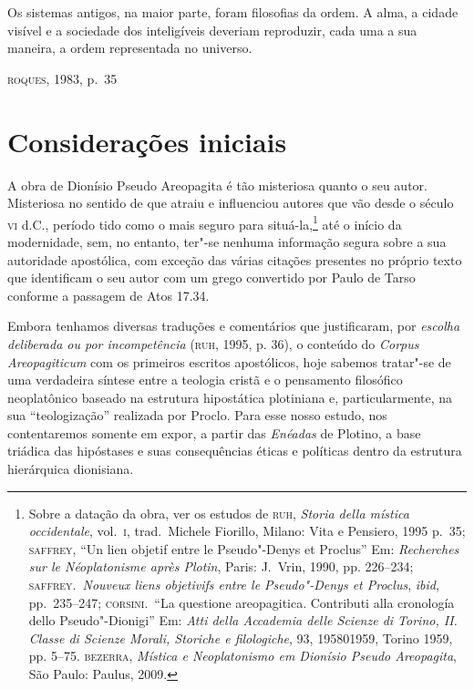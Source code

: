 

\epigraph{Os sistemas antigos, na maior parte, foram filosofias da ordem. A alma,
a cidade visível e a sociedade dos inteligíveis deveriam reproduzir,
cada uma a sua maneira, a ordem representada no universo.}{\textsc{roques}, 1983, p.~35}

\section{Considerações iniciais}


A obra de Dionísio Pseudo Areopagita é tão misteriosa quanto o seu
autor. Misteriosa no sentido de que atraiu e influenciou autores que
vão desde o século \textsc{vi} d.C., período tido como o mais seguro para
situá-la,\footnote{ Sobre a datação da obra, ver os estudos de \textsc{ruh},
\emph{Storia della mística occidentale}, vol.~\textsc{i}, trad.~Michele
Fiorillo, Milano: Vita e Pensiero, 1995 p.~35; \textsc{saffrey}, ``{Un
lien objetif entre le Pseudo"-Denys et Proclus}'' Em: \emph{Recherches sur le
Néoplatonisme après Plotin}, Paris: J.~Vrin, 1990, pp. 226--234;
\textsc{saffrey}.~\emph{Nouveux liens objetivifs entre le Pseudo"-Denys et
Proclus}, \emph{ibid}, pp.~235--247; \textsc{corsini}.~``La questione
areopagitica. Contributi alla cronología dello Pseudo"-Dionigi'' Em:
\emph{Atti della Accademia delle Scienze di Torino, II. Classe di Scienze
Morali, Storiche e filologiche}, 93, 195801959, Torino 1959, pp. 5--75.
\textsc{bezerra},  \emph{Mística e Neoplatonismo em Dionísio Pseudo
Areopagita}, São Paulo: Paulus, 2009.} até o início da
modernidade, sem, no entanto, ter"-se nenhuma informação segura sobre a
sua autoridade apostólica, com exceção das várias citações presentes no
próprio texto que identificam o seu autor com um grego convertido por
Paulo de Tarso conforme a passagem de Atos 17.34. 

Embora tenhamos diversas traduções e comentários que justificaram,
por \emph{escolha deliberada ou por incompetência} (\textsc{ruh}, 1995, p.
36), o conteúdo do \emph{Corpus Areopagiticum} com os primeiros
escritos apostólicos, hoje sabemos tratar"-se de uma verdadeira síntese
entre a teologia cristã e o pensamento filosófico neoplatônico baseado
na estrutura hipostática plotiniana e, particularmente, na sua
“teologização” realizada por Proclo. Para esse nosso estudo, nos
contentaremos somente em expor, a partir das \emph{Enéadas} de
Plotino, a base triádica das hipóstases e suas consequências éticas e
políticas dentro da estrutura hierárquica dionisiana.

